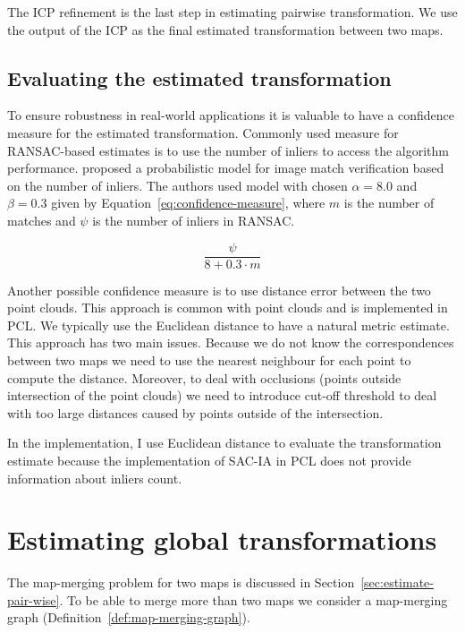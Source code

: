 The \gls{ICP} refinement is the last step in estimating pairwise transformation. We use the output of the \gls{ICP} as the final estimated transformation between two maps.

\subsection{Evaluating the estimated transformation}
\label{sec:transform-evaluation}

To ensure robustness in real-world applications it is valuable to have a confidence measure for the estimated transformation. Commonly used measure for \gls{RANSAC}-based estimates is to use the number of inliers to access the algorithm performance. \citet{brown2007automatic} proposed a probabilistic model for image match verification based on the number of inliers. The authors used model with chosen $\alpha = 8.0$ and $\beta = 0.3$ given by Equation~\eqref{eq:confidence-measure}, where $m$ is the number of matches and $\psi$ is the number of inliers in \gls{RANSAC}.

\begin{equation}
\label{eq:confidence-measure}
\frac{\psi}{8 + 0.3 \cdot m}
\end{equation}

Another possible confidence measure is to use distance error between the two point clouds. This approach is common with point clouds and is implemented in \gls{PCL}. We typically use the Euclidean distance to have a natural metric estimate. This approach has two main issues. Because we do not know the correspondences between two maps we need to use the nearest neighbour for each point to compute the distance. Moreover, to deal with occlusions (points outside intersection of the point clouds) we need to introduce cut-off threshold to deal with too large distances caused by points outside of the intersection.

In the implementation, I use Euclidean distance to evaluate the transformation estimate because the implementation of \gls{SAC-IA} in \gls{PCL} does not provide information about inliers count.


\section{Estimating global transformations}
\label{sec:estimate-global}

The map-merging problem for two maps is discussed in Section~\ref{sec:estimate-pair-wise}. To be able to merge more than two maps we consider a map-merging graph (Definition~\ref{def:map-merging-graph}).

